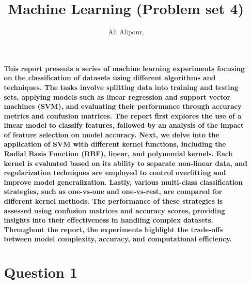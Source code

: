 \documentclass[DIV=calc, paper=a4, fontsize=11pt, twocolumn]{scrartcl}	 %
\title{Machine Learning (Problem set 4)} %
\author{Ali Alipour, } %
\date{} %
\newcommand{\initial}[1]{ %
\lettrine[lines=3,lhang=0.3,nindent=0em]{
\color{DarkGoldenrod}
{\textsf{#1}}}{}}
\begin{document}
\maketitle %

\thispagestyle{fancy} %


\initial{T}\textbf{his report presents a series of machine learning experiments focusing on the classification of datasets 
                   using different algorithms and techniques. The tasks involve splitting data into training and testing sets, 
                   applying models such as linear regression and support vector machines (SVM), and evaluating their performance 
                   through accuracy metrics and confusion matrices. The report first explores the use of a linear model to classify 
                   features, followed by an analysis of the impact of feature selection on model accuracy. Next, we delve into the 
                   application of SVM with different kernel functions, including the Radial Basis Function (RBF), linear, and polynomial 
                   kernels. Each kernel is evaluated based on its ability to separate non-linear data, and regularization techniques are 
                   employed to control overfitting and improve model generalization. Lastly, various multi-class classification strategies, 
                   such as one-vs-one and one-vs-rest, are compared for different kernel methods. The performance of these strategies is 
                   assessed using confusion matrices and accuracy scores, providing insights into their effectiveness in handling complex 
                   datasets. Throughout the report, the experiments highlight the trade-offs between model complexity, accuracy, and 
                   computational efficiency.}

\section*{\small{Question 1}}
\end{document}
